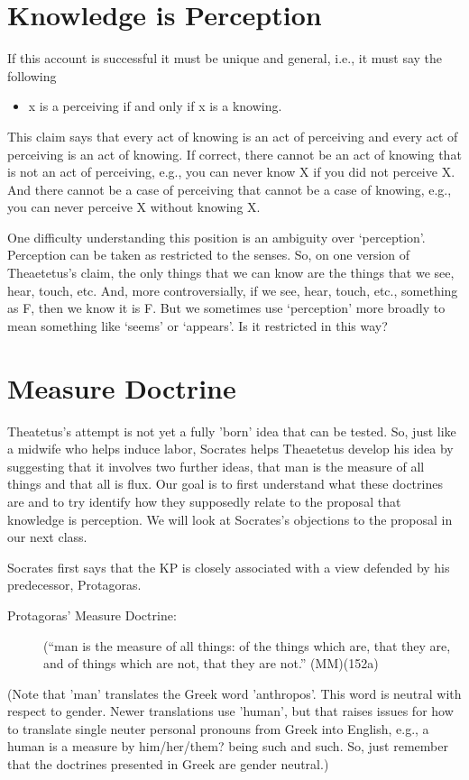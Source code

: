\documentclass[oneside]{article}
\begin{document}
\section*{Knowledge is Perception}
If this account is successful it must be unique and general, i.e., it must say the following
\begin{itemize}
\item x is a perceiving if and only if x is a knowing.
\end{itemize}
This claim says that every act of knowing is an act of perceiving and every act of perceiving is an act of knowing. If correct, there cannot be an act of knowing that is not an act of perceiving, e.g., you can never know X if you did not perceive X. And there cannot be a case of perceiving that cannot be a case of knowing, e.g., you can never perceive X without knowing X. 

One difficulty understanding this position is an ambiguity over `perception'. Perception can be taken as restricted to the senses. So, on one version of Theaetetus's claim, the only things that we can know are the things that we see, hear, touch, etc. And, more controversially, if we see, hear, touch, etc., something as F, then we know it is F. But we sometimes use `perception' more broadly to mean something like `seems' or `appears'. Is it restricted in this way? 

\section*{Measure Doctrine}
Theatetus's attempt is not yet a fully 'born' idea that can be tested. So, just like a midwife who helps induce labor, Socrates helps Theaetetus develop his idea by suggesting that it involves two further ideas, that man is the measure of all things and that all is flux. Our goal is to first understand what these doctrines are and to try identify how they supposedly relate to the proposal that knowledge is perception. We will look at Socrates's objections to the proposal in our next class. 

Socrates first says that the KP is closely associated with a view defended by his predecessor, Protagoras. 
\begin{description}
\item[Protagoras' Measure Doctrine:](“man is the measure of all things: of the things which are, that they are, and of things which are not, that they are not.” (MM)(152a) 
\end{description}
(Note that 'man' translates the Greek word 'anthropos'. This word is neutral with respect to gender. Newer translations use 'human', but that raises issues for how to translate single neuter personal pronouns from Greek into English, e.g., a human is a measure by him/her/them? being such and such. So, just remember that the doctrines presented in Greek are gender neutral.) 
\end{document}
